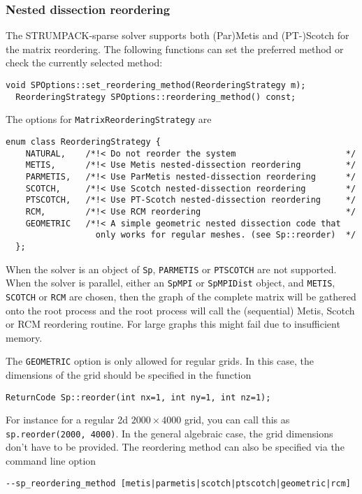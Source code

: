 \documentclass{article}
\begin{document}
\subsubsection{Nested dissection reordering}
The STRUMPACK-sparse solver supports both (Par)Metis and (PT-)Scotch
for the matrix reordering. The following functions can set the
preferred method or check the currently selected method:
\begin{lstlisting}[style=C]
  void SPOptions::set_reordering_method(ReorderingStrategy m);
  ReorderingStrategy SPOptions::reordering_method() const;
\end{lstlisting}
The options for
\lstinline[style=C]!MatrixReorderingStrategy! are
\begin{lstlisting}[style=C]
  enum class ReorderingStrategy {
    NATURAL,    /*!< Do not reorder the system                      */
    METIS,      /*!< Use Metis nested-dissection reordering         */
    PARMETIS,   /*!< Use ParMetis nested-dissection reordering      */
    SCOTCH,     /*!< Use Scotch nested-dissection reordering        */
    PTSCOTCH,   /*!< Use PT-Scotch nested-dissection reordering     */
    RCM,        /*!< Use RCM reordering                             */
    GEOMETRIC   /*!< A simple geometric nested dissection code that
                  only works for regular meshes. (see Sp::reorder)  */
  };
\end{lstlisting}
When the solver is an object of \lstinline[style=C]!Sp!,
\lstinline[style=C]!PARMETIS! or \lstinline[style=C]!PTSCOTCH! are not
supported.  When the solver is parallel, either an
\lstinline[style=C]!SpMPI! or \lstinline[style=C]!SpMPIDist! object,
and \lstinline[style=C]!METIS!, \lstinline[style=C]!SCOTCH! or
\lstinline[style=C]!RCM! are chosen, then the graph of the complete
matrix will be gathered onto the root process and the root process
will call the (sequential) Metis, Scotch or RCM reordering
routine. For large graphs this might fail due to insufficient memory.

The \lstinline[style=C]!GEOMETRIC! option is only allowed for regular
grids. In this case, the dimensions of the grid should be specified in
the function
\begin{lstlisting}[style=C]
  ReturnCode Sp::reorder(int nx=1, int ny=1, int nz=1);
\end{lstlisting}
For instance for a regular 2d $2000 \times 4000$ grid, you can call
this as \lstinline[style=C]!sp.reorder(2000, 4000)!. In the general
algebraic case, the grid dimensions don't have to be provided. The
reordering method can also be specified via the command line option
\begin{lstlisting}[style=Bash]
  --sp_reordering_method [metis|parmetis|scotch|ptscotch|geometric|rcm]
\end{lstlisting}
\end{document}
